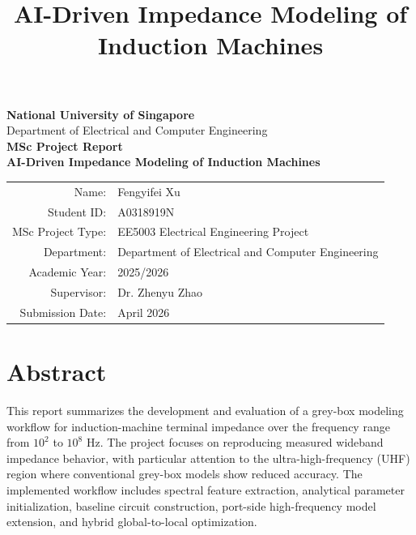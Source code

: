 \documentclass[12pt,a4paper]{article}
\begin{document}
\title{AI-Driven Impedance Modeling of Induction Machines}


\begin{titlepage}
    \centering
    \vspace*{2cm}

    {\Large \textbf{National University of Singapore}}\\[0.3cm]
    {\large Department of Electrical and Computer Engineering}\\[2.0cm]

    {\Large \textbf{MSc Project Report}}\\[1.0cm]

    {\Huge \textbf{AI-Driven Impedance Modeling of Induction Machines}}\\[2.0cm]

    \begin{tabular}{rl}
        Name: & Fengyifei Xu \\
        Student ID: & A0318919N \\
        MSc Project Type: & EE5003 Electrical Engineering Project \\
        Department: & Department of Electrical and Computer Engineering \\
        Academic Year: & 2025/2026 \\
        Supervisor: & Dr. Zhenyu Zhao \\
        Submission Date: & April 2026 \\
    \end{tabular}

    \vfill
\end{titlepage}

\clearpage
{}

\section*{Abstract}

This report summarizes the development and evaluation of a grey-box modeling workflow for induction-machine terminal impedance over the frequency range from $10^2$ to $10^8$ Hz. The project focuses on reproducing measured wideband impedance behavior, with particular attention to the ultra-high-frequency (UHF) region where conventional grey-box models show reduced accuracy. The implemented workflow includes spectral feature extraction, analytical parameter initialization, baseline circuit construction, port-side high-frequency model extension, and hybrid global-to-local optimization.
\end{document}
